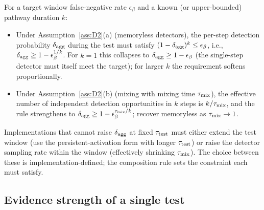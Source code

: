 \begin{proposition}
\label{prop:transient_design}
For a target window false-negative rate $\epsilon_\beta$ and a
known (or upper-bounded) pathway duration $k$:
\begin{itemize}
\item Under Assumption~\ref{ass:D2}(a) (memoryless detectors),
  the per-step detection probability $\delta_{\mathrm{agg}}$ during the
  test must satisfy
  $(1 - \delta_{\mathrm{agg}})^k \leq \epsilon_\beta$, i.e.,
  $\delta_{\mathrm{agg}} \geq 1 - \epsilon_\beta^{1/k}$.  For $k = 1$ this
  collapses to $\delta_{\mathrm{agg}} \geq 1 - \epsilon_\beta$ (the
  single-step detector must itself meet the target); for larger
  $k$ the requirement softens proportionally.
\item Under Assumption~\ref{ass:D2}(b) (mixing with mixing
  time $\tau_{\mathrm{mix}}$), the effective number of independent
  detection opportunities in $k$ steps is $k/\tau_{\mathrm{mix}}$, and the
  rule strengthens to $\delta_{\mathrm{agg}} \geq 1 -
  \epsilon_\beta^{\tau_{\mathrm{mix}}/k}$; recover memoryless as
  $\tau_{\mathrm{mix}} \to 1$.
\end{itemize}
Implementations that cannot raise $\delta_{\mathrm{agg}}$ at fixed $\tau_{\mathrm{test}}$
must either extend the test window (use the persistent-activation
form with longer $\tau_{\mathrm{test}}$) or raise the detector sampling rate
within the window (effectively shrinking $\tau_{\mathrm{mix}}$).  The choice
between these is implementation-defined; the composition rule
sets the constraint each must satisfy.
\end{proposition}

\subsection{Evidence strength of a single test}

